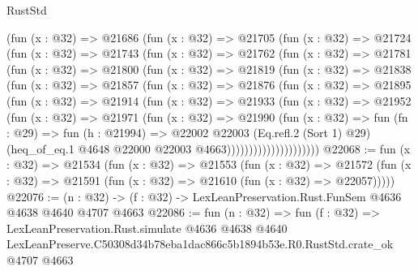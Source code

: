 \begin{lexlean}{RustStd}
\begin{coremodule}
        (fun (x : @32) =>
        @21686
          (fun (x : @32) =>
          @21705
            (fun (x : @32) =>
            @21724
              (fun (x : @32) =>
              @21743
                (fun (x : @32) =>
                @21762
                  (fun (x : @32) =>
                  @21781
                    (fun (x : @32) =>
                    @21800
                      (fun (x : @32) =>
                      @21819
                        (fun (x : @32) =>
                        @21838
                          (fun (x : @32) =>
                          @21857
                            (fun (x : @32) =>
                            @21876
                              (fun (x : @32) =>
                              @21895
                                (fun (x : @32) =>
                                @21914
                                  (fun (x : @32) =>
                                  @21933
                                    (fun (x : @32) =>
                                    @21952
                                      (fun (x : @32) =>
                                      @21971
                                        (fun (x : @32) =>
                                        @21990
                                          (fun (x : @32) =>
                                          fun (fn : @29) =>
                                          fun (h : @21994) =>
                                          @22002
                                            @22003
                                            (Eq.refl.{2} (Sort 1) @29)
                                            (heq_of_eq.{1}
                                              @4648
                                              @22000
                                              @22003
                                              @4663)))))))))))))))))))))
@22068 := fun (x : @32) =>
  @21534
    (fun (x : @32) =>
    @21553
      (fun (x : @32) =>
      @21572 (fun (x : @32) => @21591 (fun (x : @32) => @21610 (fun (x : @32) => @22057)))))
@22076 := (n : @32) -> (f : @32) -> LexLeanPreservation.Rust.FunSem @4636 @4638 @4640 @4707 @4663
@22086 := fun (n : @32) =>
  fun (f : @32) =>
  LexLeanPreservation.Rust.simulate
    @4636
    @4638
    @4640
    LexLeanPreserve.C50308d34b78eba1dac866c5b1894b53e.R0.RustStd.crate_ok
    @4707
    @4663
\end{coremodule}
\end{lexlean}
